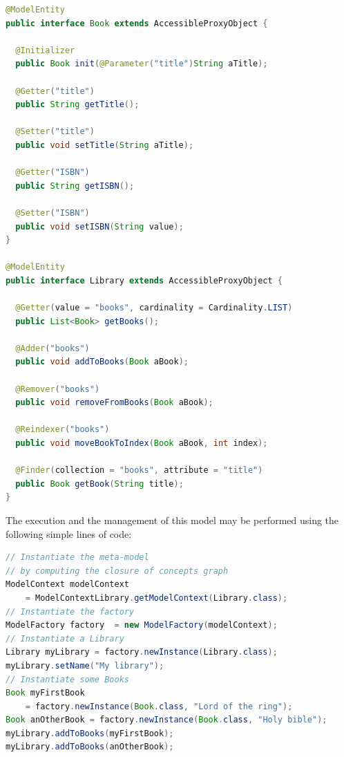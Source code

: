 \begin{lstlisting}[language=Java,basicstyle=\ttfamily\footnotesize, caption=Model creation, label=lst:model]
@ModelEntity
public interface Book extends AccessibleProxyObject {

  @Initializer
  public Book init(@Parameter("title")String aTitle);
  
  @Getter("title")
  public String getTitle();
  
  @Setter("title")
  public void setTitle(String aTitle);
  
  @Getter("ISBN")
  public String getISBN();
  
  @Setter("ISBN")
  public void setISBN(String value);
}

@ModelEntity
public interface Library extends AccessibleProxyObject {

  @Getter(value = "books", cardinality = Cardinality.LIST)
  public List<Book> getBooks();

  @Adder("books")
  public void addToBooks(Book aBook);

  @Remover("books")
  public void removeFromBooks(Book aBook);

  @Reindexer("books")
  public void moveBookToIndex(Book aBook, int index);
  
  @Finder(collection = "books", attribute = "title")
  public Book getBook(String title);
}
\end{lstlisting}

The execution and the management of this model may be performed using the following simple lines of code:

\begin{lstlisting}[language=Java,basicstyle=\ttfamily\footnotesize, caption=model execution/manipulation, label=lst:execution]
// Instantiate the meta-model
// by computing the closure of concepts graph
ModelContext modelContext 
    = ModelContextLibrary.getModelContext(Library.class);
// Instantiate the factory
ModelFactory factory  = new ModelFactory(modelContext);
// Instantiate a Library
Library myLibrary = factory.newInstance(Library.class);
myLibrary.setName("My library");
// Instantiate some Books
Book myFirstBook 
    = factory.newInstance(Book.class, "Lord of the ring");
Book anOtherBook = factory.newInstance(Book.class, "Holy bible");
myLibrary.addToBooks(myFirstBook);
myLibrary.addToBooks(anOtherBook);
\end{lstlisting}

